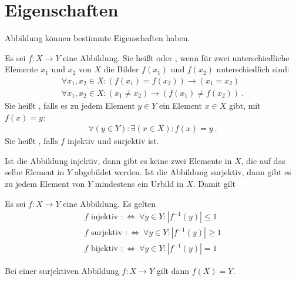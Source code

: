 \section{Eigenschaften}
\label{sec:Abbildungen:Eigenschaften}

\begin{Unit}
Abbildung können bestimmte Eigenschaften haben.

\begin{Definition}
  Es sei $f: X \rightarrow Y$ eine Abbildung. Sie heißt  
  oder , wenn für zwei unterschiedliche Elemente 
  $x_1$ und $x_2$ von $X$ die Bilder $f(x_1)$ und $f(x_2)$ unterschiedlich 
  sind:
  \begin{align}
    \forall x_1, x_2 \in X: (f(x_1) = f(x_2)) \rightarrow ( x_1 = x_2 ) \\
    \forall x_1, x_2 \in X: ( x_1 \not= x_2 ) 
      \rightarrow (f(x_1) \not= f(x_2)) \ .
  \end{align}
  Sie heißt , falls es zu jedem Element $y \in Y$ ein 
  Element $x \in X$ gibt, mit $f(x) = y$:
  \begin{align}
    \forall (y \in Y): \exists (x \in X): f(x) = y \ .
  \end{align}
  Sie heißt , falls $f$ injektiv und surjektiv ist.
\end{Definition}
\end{Unit} 

\begin{Unit}[Bemerkung]
Ist die Abbildung injektiv, dann gibt es keine zwei Elemente in $X$, die auf 
das selbe Element in $Y$ abgebildet werden. Ist die Abbildung surjektiv, dann 
gibt es zu jedem Element von $Y$ mindestens ein Urbild in $X$. Damit gilt

\begin{Bemerkung}
  Es sei $f: X \rightarrow Y$ eine Abbildung. Es gelten
  \begin{align}
    f \text{ injektiv } :\Leftrightarrow\ \forall y \in Y: |f^{-1}(y)| 
      \leq 1 \\
    f \text{ surjektiv } :\Leftrightarrow\ \forall y \in Y: |f^{-1}(y)| 
      \geq 1\\
    f \text{ bijektiv } :\Leftrightarrow\ \forall y \in Y: |f^{-1}(y)| = 1
  \end{align}
\end{Bemerkung}

Bei einer surjektiven Abbildung $f: X \rightarrow Y$ gilt dann $f(X) = Y$.
\end{Unit}

